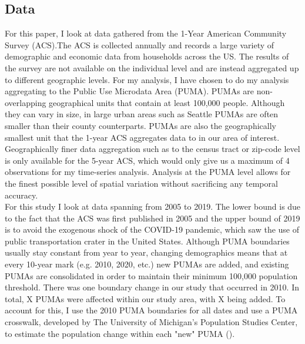 \documentclass{article}
\begin{document}
\subsection{Data}

For this paper, I look at data gathered from the 1-Year American Community Survey (ACS).The ACS is collected annually and records a large variety of demographic and economic data from households across the US. The results of the survey are not available on the individual level and are instead aggregated up to different geographic levels. For my analysis, I have chosen to do my analysis aggregating to the Public Use Microdata Area (PUMA). PUMAs are non-overlapping geographical units that contain at least 100,000 people. Although they can vary in size, in large urban areas such as Seattle PUMAs are often smaller than their county counterparts. PUMAs are also the geographically smallest unit that the 1-year ACS aggregates data to in our area of interest. Geographically finer data aggregation such as to the census tract or zip-code level is only available for the 5-year ACS, which would only give us a maximum of 4 observations for my time-series analysis. Analysis at the PUMA level allows for the finest possible level of spatial variation without sacrificing any temporal accuracy.\\

For this study I look at data spanning from 2005 to 2019. The lower bound is due to the fact that the ACS was first published in 2005 and the upper bound of 2019 is to avoid the exogenous shock of the COVID-19 pandemic, which saw the use of public transportation crater in the United States. Although PUMA boundaries usually stay constant from year to year, changing demographics means that at every 10-year mark (e.g. 2010, 2020, etc.) new PUMAs are added, and existing PUMAs are consolidated in order to maintain their minimum 100,000 population threshold. There was one boundary change in our study that occurred in 2010. In total, X PUMAs were affected within our study area, with X being added. To account for this, I use the 2010 PUMA boundaries for all dates and use a PUMA crosswalk, developed by The University of Michigan's Population Studies Center, to estimate the population change within each "new" PUMA (\cite{michigan_population_study_center_creating_2020}). \\
\end{document}
